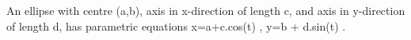  An ellipse with centre (a,b), axis in x-direction
of length c, and axis in y-direction of length d, has
parametric equations  x=a+c.cos(t)  ,
y=b + d.sin(t) . 

